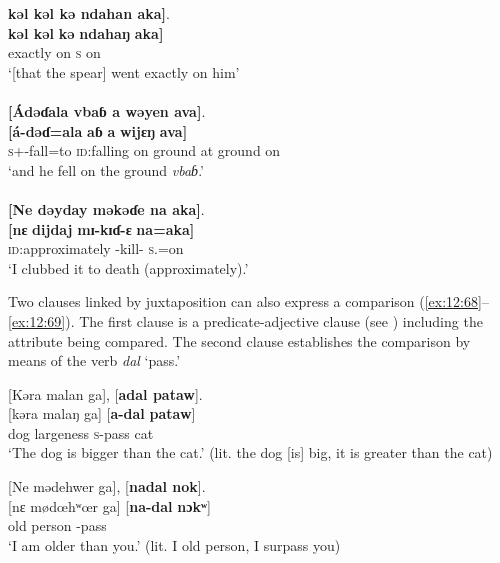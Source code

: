 \medskip
\textbf{kəl  kəl  kə  ndahan  aka]}. \\
\gll \textbf{kəl kəl} \textbf{kə}   \textbf{ndahaŋ}   \textbf{aka]} \\ 
     {exactly}    {on}    \textsc{s}          {on} \\
\glt ‘[that the spear] went exactly on him’  \\

\medskip
\clearpage
{}\\
{}\textbf{[Ádəɗala  vbaɓ  a  wəyen  ava]}.\\
\gll   \textbf{[á-dəɗ}\textbf{=ala}   \textbf{\dentalflap aɓ}  \textbf{a}  \textbf{wijɛŋ}  \textbf{ava]}\\
    \textsc{s}+{\IFV}-fall{=to}  {\textsc{id}:falling on ground}  {at}  {ground}  {on}  \\
\glt ‘and he fell on the ground \textit{vbaɓ}.’\\

\medskip
{}\\
{}\textbf{[Ne  dəyday  məkəɗe  na  aka]}.\\
\gll  \textbf{[nɛ}   \textbf{dijdaj}   \textbf{mɪ-kɪɗ-ɛ}  \textbf{na}\textbf{=aka]}\\
    {\oneS}  {\textsc{id}:approximately}     {\NOM}{}-kill-{\CL}   \textsc{s}.{\DO}{=on}\\
\glt ‘I clubbed it to death (approximately).’\\
\z  

Two clauses linked by juxtaposition can also express a comparison (\ref{ex:12:68}--\ref{ex:12:69}). The first clause is a predicate-adjective clause (see ) including the attribute being compared. The second clause establishes the comparison by means of the verb \textit{dal} ‘pass.’

\ea \label{ex:12:68}
{}[Kəra  malan  ga],  [\textbf{adal  pataw}].\\
\gll  {}[kəra  malaŋ  ga]   [\textbf{a-dal}    \textbf{pataw}]\\
      dog    largeness  {\ADJ}      \textsc{s}-pass  cat\\
\glt  ‘The dog is bigger than the cat.’ (lit. the dog [is] big, it is greater than the cat)
\z 

\ea \label{ex:12:69}
{}[Ne  mədehwer  ga],  [\textbf{nadal  nok}].\\
\gll  {}[nɛ  mødœhʷœr  ga]    [\textbf{na-dal}  \textbf{nɔkʷ}]\\
      {\oneS}  {old person}  {\ADJ}    {\oneS}-pass  {\twoS}\\
\glt  ‘I am older than you.’ (lit. I old person, I surpass you)
\z 
